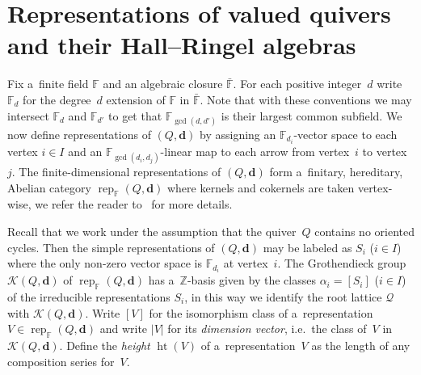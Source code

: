 \section{Representations of valued quivers\\ and their Hall--Ringel
algebras}\label{sec:valued quivers}

Fix a~f\/inite f\/ield $\mathbb{F}$ and an algebraic closure $\bar{\mathbb{F}}$.
For each positive integer~$d$ write $\mathbb{F}_d$ for the degree~$d$ extension of $\mathbb{F}$ in $\bar{\mathbb{F}}$.
Note that with these conventions we may intersect $\mathbb{F}_d$ and $\mathbb{F}_{d'}$ to get that
$\mathbb{F}_{\gcd(d,d')}$ is their largest common subf\/ield.
We now def\/ine representations of $(Q,\mathbf{d})$ by assigning an $\mathbb{F}_{d_i}$-vector space to each vertex $i\in
I$ and an $\mathbb{F}_{\gcd(d_i,d_j)}$-linear map to each arrow from vertex~$i$ to vertex~$j$.
The f\/inite-dimensional representations of $(Q,\mathbf{d})$ form a~f\/initary, hereditary, Abelian category
$\operatorname{rep}_\mathbb{F}(Q,\mathbf{d})$ where kernels and cokernels are taken vertex-wise, we refer the reader  %
to~\cite{rupel1} for more details.

Recall that we work under the assumption that the quiver~$Q$ contains no oriented cycles.
Then the simple representations of $(Q,\mathbf{d})$ may be labeled as $S_i$ ($i\in I$) where the only non-zero vector  %
space is $\mathbb{F}_{d_i}$ at vertex~$i$.
The Grothendieck group $\mathcal{K}(Q,\mathbf{d})$ of $\operatorname{rep}_\mathbb{F}(Q,\mathbf{d})$ has
a~$\mathbb{Z}$-basis given by the classes $\alpha_i=[S_i]$ ($i\in I$) of the irreducible representations $S_i$, in this
way we identify the root lattice $\mathcal{Q}$ with $\mathcal{K}(Q,\mathbf{d})$.
Write $[V]$ for the isomorphism class of a~representation $V\in\operatorname{rep}_\mathbb{F}(Q,\mathbf{d})$ and write
$|V|$ for its \emph{dimension vector}, i.e.~the class of~$V$ in $\mathcal{K}(Q,\mathbf{d})$.
Def\/ine the \emph{height} $\operatorname{ht}(V)$ of a~representation~$V$ as the length of any composition series for~$V$.

